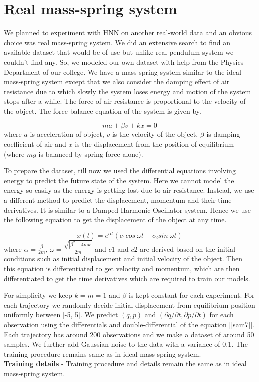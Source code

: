 \documentclass{article}
\begin{document}
\section{Real mass-spring system}
We planned to experiment with HNN on another real-world data and an obvious choice was real mass-spring system. We did an extensive search to find an available dataset that would be of use but unlike real pendulum system we couldn't find any. So, we modeled our own dataset with help from the Physics Department of our college. We have a mass-spring system similar to the ideal mass-spring system except that we also consider the damping effect of air resistance due to which slowly the system loses energy and motion of the system stops after a while. The force of air resistance is proportional to the velocity of the object. The force balance equation of the system is given by.

\begin{equation}
    ma + \beta v + kx = 0
\end{equation}
where \(a\) is acceleration of object, \(v\) is the velocity of the object, \(\beta\) is damping coefficient of air and \(x\) is the displacement from the position of equilibrium (where \(mg\) is balanced by spring force alone).

To prepare the dataset, till now we used the differential equations involving energy to predict the future state of the system. Here we cannot model the energy so easily as the energy is getting lost due to air resistance. Instead, we use a different method to predict the displacement, momentum and their time derivatives. It is similar to a Damped Harmonic Oscillator system. Hence we use the following equation to get the displacement of the object at any time.

\begin{equation}\label{sam7}
    x(t) = e^{\alpha t}(c_1 cos\:\omega t + c_2 sin\:\omega t)
\end{equation}
where \(\alpha = \frac{\beta}{2m}\), \(\omega = \frac{\sqrt{|\beta^2-4mk|}}{2m}\) and \(c1\) and \(c2\) are derived based on the initial conditions such as initial displacement and initial velocity of the object. Then this equation is differentiated to get velocity and momentum, which are then differentiated to get the time derivatives which are required to train our models.

For simplicity we keep \(k = m = 1\) and \(\beta\) is kept constant for each experiment. For each trajectory we randomly decide initial displacement from equilibrium position uniformly between [-5, 5]. We predict \((q, p)\) and \((\partial q/\partial t, \partial p/\partial t)\) for each observation using the differentials and double-differential of the equation [\ref{sam7}]. Each trajectory has around 200 observations and we make a dataset of around 50 samples. We further add Gaussian noise to the data with a variance of 0.1. The training procedure remains same as in ideal mass-spring system.\\
\textbf{Training details} - Training procedure and details remain the same as in ideal mass-spring system.
\end{document}
